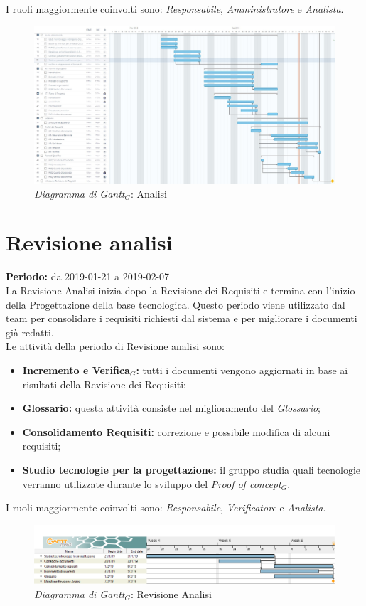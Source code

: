 \begin{flushleft}
\begin{itemize}
\end{itemize}
I ruoli maggiormente coinvolti sono: \textit{Responsabile}, \textit{Amministratore} e \textit{Analista}.
\begin{figure} [h]
    \centering
    \includegraphics[scale=0.3]{./images/analisi.jpg}
    \caption{\textit{Diagramma di Gantt$_{G}$}: Analisi}\label{G1}
\end{figure}
\section{Revisione analisi}
\textbf{Periodo:} da 2019-01-21 a 2019-02-07\\
La Revisione Analisi inizia dopo la Revisione dei Requisiti e termina con l’inizio della Progettazione della base tecnologica. Questo periodo viene utilizzato dal team per consolidare i requisiti richiesti dal sistema e per migliorare i documenti già redatti.\\
Le attività della periodo di Revisione analisi sono:
\begin{itemize}
    \item \textbf{Incremento e Verifica$_{G}$:} tutti i documenti vengono aggiornati in base ai risultati della Revisione dei Requisiti;
    \item \textbf{Glossario:} questa attività consiste nel miglioramento del \textit{Glossario};
    \item \textbf{Consolidamento Requisiti:} correzione e possibile modifica di alcuni requisiti;
    \item \textbf{Studio tecnologie per la progettazione:} il gruppo studia quali tecnologie verranno utilizzate durante lo sviluppo del \textit{Proof of concept$_{G}$}.  
\end{itemize}
I ruoli maggiormente coinvolti sono: \textit{Responsabile}, \textit{Verificatore} e \textit{Analista}.
\begin{figure} [h]
    \centering
    \includegraphics[scale=0.45]{./images/ZeroSevenGanttRevisioneA.png}
    \caption{\textit{Diagramma di Gantt$_{G}$}: Revisione Analisi }\label{G2}
\end{figure}
\newpage

\end{flushleft}
